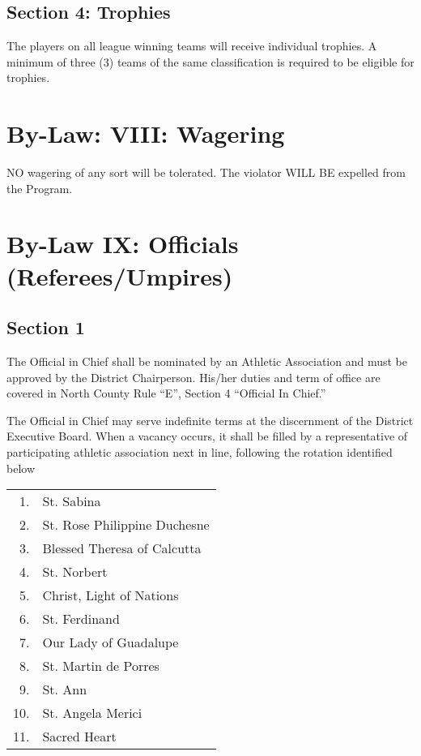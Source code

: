 \documentclass[letteraper,10pt,oneside,draft]{memoir}
\begin{document}
\subsection{Section 4: Trophies}
The players on all league winning teams will receive individual trophies.  A minimum of three (3) teams of the same classification is required to be eligible for trophies.

\section{By-Law: VIII: Wagering}
NO wagering of any sort will be tolerated. The violator WILL BE expelled from the Program.

\section{By-Law IX: Officials (Referees/Umpires)}
\subsection{Section 1}
The Official in Chief shall be nominated by an Athletic Association and must be approved by the District Chairperson.  His/her duties and term of office are covered in North County Rule ``E'', Section 4 ``Official In Chief.''

The Official in Chief may serve indefinite terms at the discernment of the District Executive Board. When a vacancy occurs, it shall be filled by a representative of participating athletic association next in line, following the rotation identified below

\begin{center}
    \begin{tabular}{ r l }
        1. & St. Sabina \\
        2. & St. Rose Philippine Duchesne \\
        3. & Blessed Theresa of Calcutta \\
        4. & St. Norbert \\
        5. & Christ, Light of Nations \\
        6. & St. Ferdinand \\
        7. & Our Lady of Guadalupe \\
        8. & St. Martin de Porres \\
        9. & St. Ann \\
        10. & St. Angela Merici \\
        11. & Sacred Heart \\
    \end{tabular}
\end{center}
\end{document}
